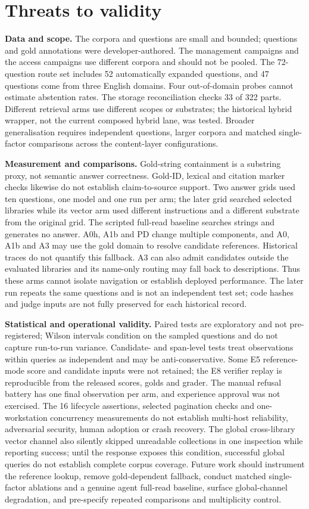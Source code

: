 \section{Threats to validity}
\label{sec:threats}

\noindent\textbf{Data and scope.} The corpora and questions are small and
bounded; questions and gold annotations were developer-authored. The
management campaigns and the access campaigns use different corpora and
should not be pooled. The 72-question route set includes 52 automatically
expanded questions, and 47 questions come from three English domains. Four
out-of-domain probes cannot estimate abstention rates. The storage
reconciliation checks 33 of 322 parts. Different retrieval arms use different
scopes or substrates; the historical hybrid wrapper, not the current composed
hybrid lane, was tested. Broader generalisation requires independent questions,
larger corpora and matched single-factor comparisons across the content-layer
configurations.

\noindent\textbf{Measurement and comparisons.} Gold-string containment is a
substring proxy, not semantic answer correctness. Gold-ID, lexical and citation
marker checks likewise do not establish claim-to-source support. Two answer
grids used ten questions, one model and one run per arm; the later grid
searched selected libraries while its vector arm used different instructions
and a different substrate from the original grid. The scripted
full-read baseline searches strings and generates no answer. A0h, A1b and PD
change multiple components, and A0, A1b and A3 may use the gold domain to
resolve candidate references. Historical traces do not quantify this fallback.
A3 can also admit candidates outside the evaluated libraries and its
name-only routing may fall back to descriptions. Thus these arms cannot isolate
navigation or establish deployed performance. The later run repeats the same
questions and is not an independent test set; code hashes and judge inputs are
not fully preserved for each historical record.

\noindent\textbf{Statistical and operational validity.} Paired tests are
exploratory and not pre-registered; Wilson intervals condition on the sampled
questions and do not capture run-to-run variance. Candidate- and span-level
tests treat observations within queries as independent and may be
anti-conservative. Some E5 reference-mode score and candidate inputs were not retained; the E8
verifier replay is reproducible from the released scores, golds and grader.
The manual refusal battery has one final observation per arm, and experience
approval was not exercised. The 16 lifecycle assertions, selected pagination
checks and one-workstation concurrency measurements do not establish multi-host
reliability, adversarial security, human adoption or crash recovery. The global
cross-library vector channel also silently skipped unreadable collections in
one inspection while reporting success; until the response exposes this
condition, successful global queries do not establish complete corpus coverage.
Future work should instrument the reference lookup, remove gold-dependent
fallback, conduct matched single-factor ablations and a genuine agent full-read
baseline, surface global-channel degradation, and pre-specify repeated
comparisons and multiplicity control.
